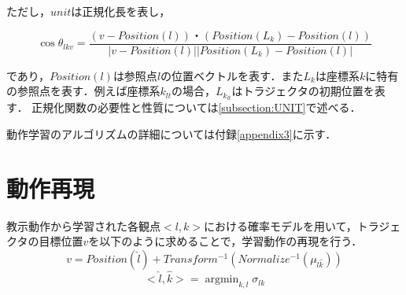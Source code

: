 ただし，$unit$は正規化長を表し，

\[
	\cos θ_{lkv} = \frac{(v-Position(l))・(Position(L_{k})-Position(l))}{| v-Position(l) || Position(L_{k})-Position(l) |}
\]

であり，$Position(l)$は参照点$l$の位置ベクトルを表す．また$L_{k}$は座標系$k$に特有の参照点を表す．例えば座標系$k_{lt}$の場合，$L_{k_{lt}}$はトラジェクタの初期位置を表す．
正規化関数の必要性と性質については\ref{subsection:UNIT}で述べる．

動作学習のアルゴリズムの詳細については付録\ref{appendix3}に示す．

\section{動作再現}

教示動作から学習された各観点$<l , k>$における確率モデルを用いて，トラジェクタの目標位置$v$を以下のように求めることで，学習動作の再現を行う．
\begin{equation}
	v =  Position(\hat{l}) +Transform^{-1}(Normalize^{-1}(μ_{\hat{l}\hat{k}})) 
\end{equation}
\begin{equation}
	<\hat{l} , \hat{k}> =  \mathop{\arg\min}_{k , l}σ_{lk}
\end{equation}

